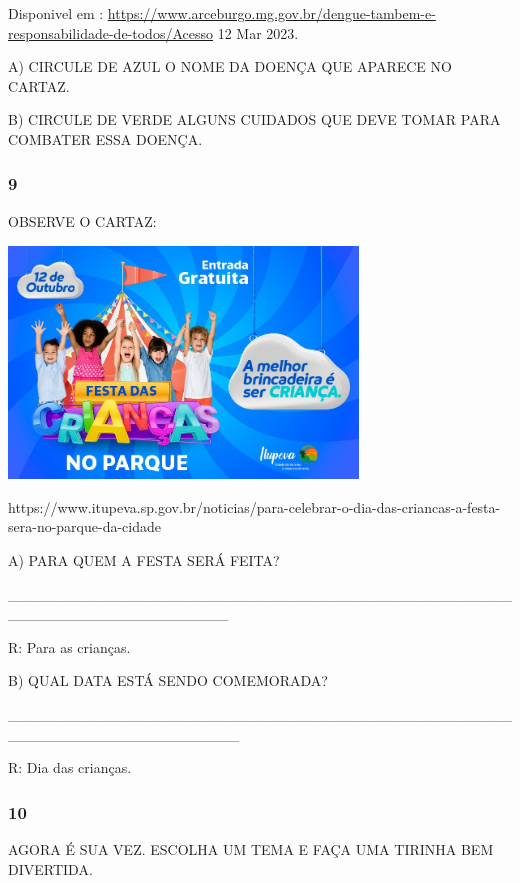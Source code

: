 Disponivel em :
\url{https://www.arceburgo.mg.gov.br/dengue-tambem-e-responsabilidade-de-todos/Acesso}
12 Mar 2023.

A) CIRCULE DE AZUL O NOME DA DOENÇA QUE APARECE NO CARTAZ.

B) CIRCULE DE VERDE ALGUNS CUIDADOS QUE DEVE TOMAR PARA COMBATER ESSA
DOENÇA.

\subsubsection{9}\label{section-89}

OBSERVE O CARTAZ:

\includegraphics[width=3.66026in,height=2.43572in]{media/image135.jpeg}

https://www.itupeva.sp.gov.br/noticias/para-celebrar-o-dia-das-criancas-a-festa-sera-no-parque-da-cidade

A) PARA QUEM A FESTA SERÁ FEITA?

\_\_\_\_\_\_\_\_\_\_\_\_\_\_\_\_\_\_\_\_\_\_\_\_\_\_\_\_\_\_\_\_\_\_\_\_\_\_\_\_\_\_\_\_\_\_\_\_\_\_\_\_\_\_\_\_\_\_\_\_\_\_\_\_\_\_\_\_\_

R: Para as crianças.

B) QUAL DATA ESTÁ SENDO COMEMORADA?

\_\_\_\_\_\_\_\_\_\_\_\_\_\_\_\_\_\_\_\_\_\_\_\_\_\_\_\_\_\_\_\_\_\_\_\_\_\_\_\_\_\_\_\_\_\_\_\_\_\_\_\_\_\_\_\_\_\_\_\_\_\_\_\_\_\_\_\_\_\_

R: Dia das crianças.

\subsubsection{10 }\label{section-90}

AGORA É SUA VEZ. ESCOLHA UM TEMA E FAÇA UMA TIRINHA BEM DIVERTIDA.

\begin{longtable}[]{@{}ll@{}}
\toprule
&\tabularnewline
\bottomrule
\end{longtable}

